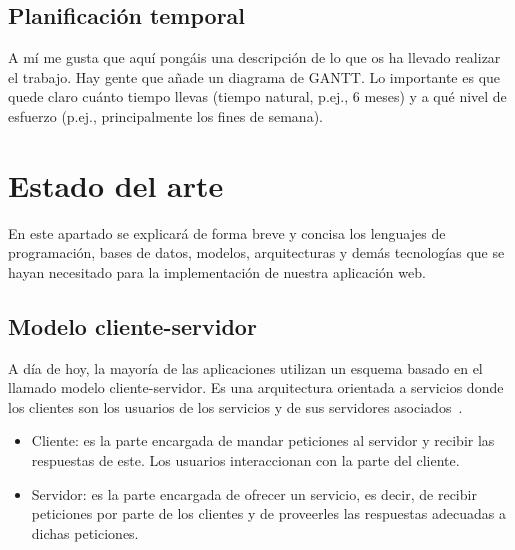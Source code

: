 \documentclass[a4paper, 12pt]{book}
\begin{document}
\section{Planificación temporal}
\label{sec:planificacion-temporal}

A mí me gusta que aquí pongáis una descripción de lo que os ha llevado realizar el trabajo.
Hay gente que añade un diagrama de GANTT.
Lo importante es que quede claro cuánto tiempo llevas (tiempo natural, p.ej., 6 meses) y a qué nivel de esfuerzo (p.ej., principalmente los fines de semana).



\cleardoublepage
\chapter{Estado del arte}
\label{chap:estado}

En este apartado se explicará de forma breve y concisa los lenguajes de programación, bases de datos, modelos, arquitecturas y demás tecnologías que se hayan necesitado para la implementación de nuestra aplicación web.



\section{Modelo cliente-servidor} 
\label{sec:seccion1}
A día de hoy, la mayoría de las aplicaciones utilizan un esquema basado en el llamado modelo cliente-servidor. Es una arquitectura orientada a servicios donde los clientes son los usuarios de los servicios y de sus servidores asociados~\cite{castro2015arquitectura}.
 \begin{itemize}
          \item
         Cliente: es la parte encargada de mandar peticiones al servidor y recibir las respuestas de este. Los usuarios interaccionan con la parte del cliente.
          \item
          Servidor: es la parte encargada de ofrecer un servicio, es decir, de recibir peticiones por parte de los clientes y de proveerles las respuestas adecuadas a dichas peticiones.~\cite{lizama2016redes} 
     \end{itemize}
     
\end{document}
